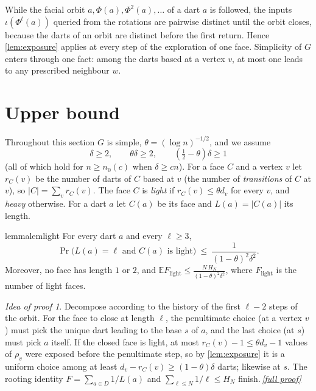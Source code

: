 \documentclass[11pt,a4paper]{article}
\theoremstyle{plain}
\theoremstyle{definition}
\theoremstyle{remark}
\newtheorem*{proofidea}{Idea of proof}
\newcommand{\fullproofref}[1]{\,\hyperref[#1]{\textit{[full proof]}}}
\newcommand{\E}{\mathbb E}
\newcommand{\Flight}{F_{\mathrm{light}}}
\begin{document}
While the facial orbit $a,\Phi(a),\Phi^2(a),\dots$ of a dart $a$ is followed, the inputs $\iota(\Phi^t(a))$ queried from the rotations are pairwise distinct until the orbit closes, because the darts of an orbit are distinct before the first return. Hence \cref{lem:exposure} applies at every step of the exploration of one face. Simplicity of $G$ enters through one fact: among the darts based at a vertex $v$, at most one leads to any prescribed neighbour $w$.

\section{Upper bound}\label{sec:upper}

Throughout this section $G$ is simple, $\theta=(\log n)^{-1/2}$, and we assume
\begin{equation}\label{eq:thresholds}
 \delta\ge2,\qquad \theta\delta\ge2,\qquad (\tfrac12-\theta)\delta\ge1
\end{equation}
(all of which hold for $n\ge n_0(c)$ when $\delta\ge cn$). For a face $C$ and a vertex $v$ let $r_C(v)$ be the number of darts of $C$ based at $v$ (the number of \emph{transitions} of $C$ at $v$), so $|C|=\sum_vr_C(v)$. The face $C$ is \emph{light} if $r_C(v)\le\theta d_v$ for every $v$, and \emph{heavy} otherwise. For a dart $a$ let $C(a)$ be its face and $L(a)=|C(a)|$ its length.

\begin{restatable}{lemma}{lemlight}\label{lem:light}
For every dart $a$ and every $\ell\ge3$,
\[
 \Pr\bigl(L(a)=\ell\text{ and }C(a)\text{ is light}\bigr)\ \le\ \frac1{(1-\theta)^2\delta^2}.
\]
Moreover, no face has length $1$ or $2$, and $\displaystyle\E\Flight\le\frac{N\,H_N}{(1-\theta)^2\delta^2}$, where $\Flight$ is the number of light faces.
\end{restatable}
\begin{proofidea}
Decompose according to the history of the first $\ell-2$ steps of the orbit. For the face to close at length $\ell$, the penultimate choice (at a vertex $v$) must pick the unique dart leading to the base $s$ of $a$, and the last choice (at $s$) must pick $a$ itself. If the closed face is light, at most $r_C(v)-1\le\theta d_v-1$ values of $\rho_v$ were exposed before the penultimate step, so by \cref{lem:exposure} it is a uniform choice among at least $d_v-r_C(v)\ge(1-\theta)\delta$ darts; likewise at $s$. The rooting identity $F=\sum_{a\in D}1/L(a)$ and $\sum_{\ell\le N}1/\ell\le H_N$ finish.\fullproofref{pf:light}
\end{proofidea}
\end{document}
